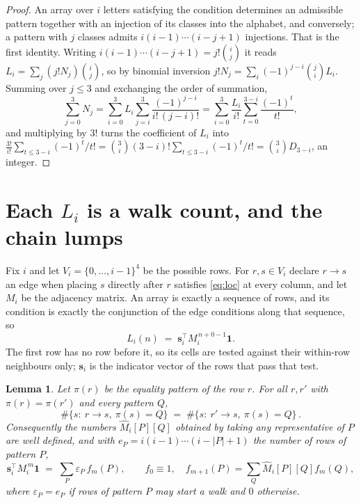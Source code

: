 \documentclass[11pt,a4paper]{article}
\theoremstyle{plain}
\newtheorem{lemma}[theorem]{Lemma}
\theoremstyle{definition}
\begin{document}
\begin{proof}
An array over $i$ letters satisfying the condition determines an admissible pattern together
with an injection of its classes into the alphabet, and conversely; a pattern with $j$
classes admits $i(i-1)\cdots(i-j+1)$ injections. That is the first identity. Writing
$i(i-1)\cdots(i-j+1)=j!\binom{i}{j}$ it reads $L_i=\sum_j (j!N_j)\binom{i}{j}$, so by
binomial inversion $j!N_j=\sum_{i}(-1)^{j-i}\binom{j}{i}L_i$. Summing over
$j\le 3$ and exchanging the order of summation,
\[
\sum_{j=0}^{3}N_j=\sum_{i=0}^{3}L_i\sum_{j=i}^{3}\frac{(-1)^{j-i}}{i!\,(j-i)!}
=\sum_{i=0}^{3}\frac{L_i}{i!}\sum_{t=0}^{3-i}\frac{(-1)^t}{t!} ,
\]
and multiplying by $3!$ turns the coefficient of $L_i$ into
$\frac{3!}{i!}\sum_{t\le 3-i}(-1)^t/t!=\binom{3}{i}(3-i)!\sum_{t\le 3-i}(-1)^t/t!
=\binom{3}{i}D_{3-i}$, an integer.
\end{proof}

\section{Each $L_i$ is a walk count, and the chain lumps}

Fix $i$ and let $V_i=\{0,\dots,i-1\}^{4}$ be the possible rows. For $r,s\in V_i$
declare $r\to s$ an edge when placing $s$ directly after $r$ satisfies \eqref{eq:loc} at
every column, and let $M_i$ be the adjacency matrix. An array is exactly a sequence of
rows, and its condition is exactly the conjunction of the edge conditions along that
sequence, so
\[
L_i(n)\;=\;\mathbf{s}_i^{\!\top}M_i^{\,n+0-1}\mathbf{1} .
\]
The first row has no row before it, so its cells are tested
against their within-row neighbours only; $\mathbf{s}_i$ is the indicator vector of the
rows that pass that test.

\begin{lemma}\label{lem:lump}
Let $\pi(r)$ be the equality pattern of the row $r$. For all $r,r'$ with
$\pi(r)=\pi(r')$ and every pattern $Q$,
\[
\#\{s:\ r\to s,\ \pi(s)=Q\}\;=\;\#\{s:\ r'\to s,\ \pi(s)=Q\}\, .
\]
Consequently the numbers $\widehat M_i[P][Q]$ obtained by taking any representative of $P$
are well defined, and with $e_P=i(i-1)\cdots(i-|P|+1)$ the number of rows of pattern $P$,
\[
\mathbf{s}_i^{\!\top}M_i^{\,m}\mathbf{1}\;=\;\sum_P \varepsilon_P\,f_m(P),
\qquad f_0\equiv1,\quad f_{m+1}(P)=\sum_Q\widehat M_i[P][Q]f_m(Q),
\]
where $\varepsilon_P=e_P$ if rows of pattern $P$ may start a walk and $0$ otherwise.
\end{lemma}
\end{document}
